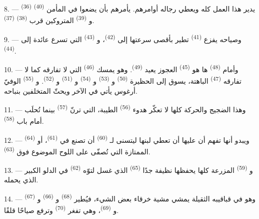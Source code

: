 \VUsaut{3.0mm}
\VUsaut{3.0mm}

8. ---  \textsuperscript{(36)} يدير هذا العمل كله ويعطي
رجاله أوامرهم. يأمرهم بأن يضعوا في المأمن  \textsuperscript{(40)}
و \textsuperscript{(39)} المتروكين قرب  \textsuperscript{(38)}
 \textsuperscript{(37)}.

9. --- وصياحه يفزع  \textsuperscript{(41)} تطير بأقصى سرعتها إلى
 \textsuperscript{(42)}، و \textsuperscript{(43)} التي
تسرع عائدة إلى  \textsuperscript{(44)}.

10. --- وأمام  \textsuperscript{(48)} ها هو 
\textsuperscript{(45)} العجوز يعيد  \textsuperscript{(49)}. وهو يمسك
 \textsuperscript{(46)} التي لا تفارقه كما لا تفارقه
 \textsuperscript{(47)} الباهتة، يسوق إلى الحظيرة
 \textsuperscript{(50)} و \textsuperscript{(53)}
و \textsuperscript{(54)} و \textsuperscript{(51)}
و \textsuperscript{(52)}. و \textsuperscript{(55)} الوفيّ
أرغوس يأتي في الآخر ويحثّ المتخلفين بنباحه.

11. --- وهذا الضجيج والحركة كلها لا تعكّر هدوء 
\textsuperscript{(56)} الطيبة، التي ترنّ  \textsuperscript{(57)} بينما
تُحلَب أمام باب  \textsuperscript{(58)}.

12. --- ويبدو أنها تفهم أن عليها أن تعطي لبنها ليتسنى لـ \textsuperscript{(60)} أن تصنع  في 
\textsuperscript{(61)}، أو  \textsuperscript{(64)} الممتازة التي
تُصفّى على اللوح الموضوع فوق  \textsuperscript{(63)}.

13. --- و \textsuperscript{(59)} المزرعة كلها يحفظها نظيفة جدًا
 \textsuperscript{(65)} الذي غسل لتوّه 
\textsuperscript{(62)} في الدلو الكبير الذي يحمله.

\VUsaut{3.0mm}
\VUsaut{3.0mm}

14. --- وهو في قباقيبه الثقيلة يمشي مشية خرقاء بعض الشيء، فيُطير
 \textsuperscript{(68)} و \textsuperscript{(66)}
و \textsuperscript{(67)} و \textsuperscript{(69)}،
وهي تفغر  \textsuperscript{(70)} وترفع صياحًا قلقًا.

